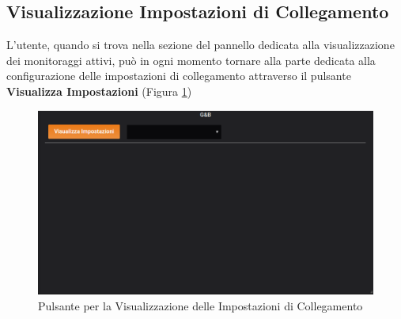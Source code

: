 \subsection{Visualizzazione Impostazioni di Collegamento}\label{ImpostazioniCollegamento}

L'utente, quando si trova nella sezione del pannello dedicata alla visualizzazione dei monitoraggi attivi, può in ogni momento tornare alla parte dedicata alla configurazione delle impostazioni di collegamento attraverso il pulsante \textbf{Visualizza Impostazioni} (Figura \ref{VisualizzaImpostazioni})\\

\begin{figure}[H]
	\begin{center}
		\includegraphics[scale=0.68]{./images/VisualizzaImpostazioni.png}
		 \caption{Pulsante per la Visualizzazione delle Impostazioni di Collegamento}	
		 \label{VisualizzaImpostazioni}
	\end{center}
\end{figure}

